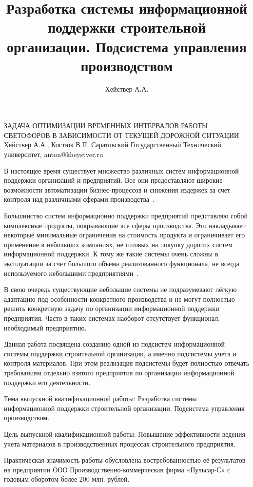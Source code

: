 \documentclass[a4paper,13pt]{article}
\title{Разработка системы информационной поддержки строительной организации. Подсистема управления производством}
\author{Хействер А.А.}
\date{}
\begin{document}
\begin{center} %
    \large ЗАДАЧА ОПТИМИЗАЦИИ ВРЕМЕННЫХ ИНТЕРВАЛОВ РАБОТЫ СВЕТОФОРОВ В ЗАВИСИМОСТИ ОТ ТЕКУЩЕЙ ДОРОЖНОЙ СИТУАЦИИ\\
    \large Хействер А.А., Костюк В.П.
    \large Саратовский Государственный Технический университет, anton@kheystver.ru
\end{center} %
\thispagestyle{empty} %
В настоящее время существует множество различных систем информационной поддержки организаций и предприятий. Все они предоставляют широкие возможности автоматизации бизнес-процессов и снижения издержек за счет контроля над различными сферами производства~\cite{pa}.

Большинство систем информационно поддержки предприятий представляю собой комплексные продукты, покрывающие все сферы производства. Это накладывает некоторые минимальные ограничения на стоимость продукта и ограничивает его применение в небольших компаниях, не готовых на покупку дорогих систем информационной поддержки. К тому же такие системы очень сложны в эксплуатации за счет большого объема реализованного функционала, не всегда используемого небольшими предприятиями~\cite{pb}.

В свою очередь существующие небольшие системы не подразумевают лёгкую адаптацию под особенности конкретного производства и не могут полностью решить конкретную задачу по организации информационной поддержки предприятия. Часто в таких системах наоборот  отсутствует функционал, необходимый предприятию.

Данная работа посвящена созданию одной из подсистем информационной системы поддержки строительной организации, а именно подсистемы учета и контроля материалов. При этом реализация подсистемы будет полностью отвечать требованиям отдельно взятого предприятия по организации информационной поддержки его деятельности.

Тема выпускной квалификационной работы:  Разработка системы информационной поддержки строительной организации. Подсистема управления производством.

Цель выпускной квалификационной работы: Повышение эффективности ведения учета материалов в производственных процессах строительного предприятия. 

Практическая значимость работы обусловлена востребованностью её результатов на предприятии ООО Производственно-коммерческая фирма «Пульсар-С» с годовым оборотом более 200 млн. рублей.
\end{document}
